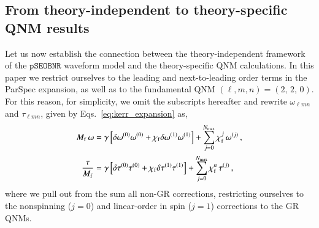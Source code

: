 \documentclass[twocolumn,
               prd,
               aps,
               superscriptaddress,
               tightenlines,
               nofootinbib,
               eqsecnum,
               amsfonts,
               amsmath,
               longbibliography]{revtex4-1}
\newcommand{\pSEOB}{\texttt{pSEOBNR}}
\begin{document}

\subsection{From theory-independent to theory-specific QNM results}
\label{sec:theory_specific_qnm}

Let us now establish the connection between the theory-independent framework of the
$\pSEOB$ waveform model and the theory-specific QNM calculations. In this paper we restrict ourselves
to the leading and next-to-leading order terms in the ParSpec expansion, as well as to the fundamental QNM
$(\ell, m, n) = (2,\, 2,\, 0)$. For this reason, for simplicity, we omit the subscripts hereafter
and rewrite $\omega_{\ell m n}$ and $\tau_{\ell m n}$, given by Eqs.~\eqref{eq:kerr_expansion} as,
%
\begin{subequations}
\label{eq:qnm_nongr_iso}
\begin{align}
    M_{\rm f}\, \omega &= \gamma \left [ \delta\omega^{(0)} \omega^{(0)} + \chi_{\rm f} \delta\omega^{(1)} \omega^{(1)} \right ]
    + \sum_{j=0}^{N_{\rm max}} \chi^{j}_{\rm f}\, \omega^{(j)} \,,
\\
    \frac{\tau}{M_{\rm f}}   &= \gamma \left [ \delta\tau^{(0)} \tau^{(0)} + \chi_{\rm f} \delta\tau^{(1)} \tau^{(1)} \right ]
    + \sum_{j=0}^{N_{\rm max}} \chi^{n}_{\rm f}\, \tau^{(j)}\,,
\end{align}
\end{subequations}
%
where we pull out from the sum all non-GR corrections, restricting
ourselves to the nonspinning ($j=0$) and linear-order in spin ($j=1$)
corrections to the GR QNMs.
\end{document}
